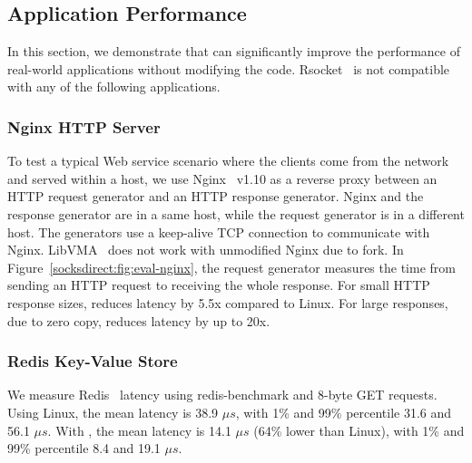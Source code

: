 \subsection{Application Performance}
\label{socksdirect:subsec:application}

In this section, we demonstrate that \sys{} can significantly improve the performance of real-world applications without modifying the code.
Rsocket~\cite{rsockets} is not compatible with any of the following applications.

\subsubsection{Nginx HTTP Server}
\quad

To test a typical Web service scenario where the clients come from the network and served within a host, we use Nginx~\cite{nginx} v1.10 as a reverse proxy between an HTTP request generator and an HTTP response generator.
Nginx and the response generator are in a same host, while the request generator is in a different host.
The generators use a keep-alive TCP connection to communicate with Nginx.
LibVMA~\cite{libvma} does not work with unmodified Nginx due to fork.
In Figure~\ref{socksdirect:fig:eval-nginx}, the request generator measures the time from sending an HTTP request to receiving the whole response.
For small HTTP response sizes, \sys{} reduces latency by 5.5x compared to Linux.
For large responses, due to zero copy, \sys{} reduces latency by up to 20x.



\subsubsection{Redis Key-Value Store}
\quad

We measure Redis~\cite{redis} latency using redis-benchmark and 8-byte GET requests.
Using Linux, the mean latency is 38.9 $\mu s$, with 1\% and 99\% percentile 31.6 and 56.1 $\mu s$.
With \sys{}, the mean latency is 14.1 $\mu s$ (64\% lower than Linux), with 1\% and 99\% percentile 8.4 and 19.1 $\mu s$.


